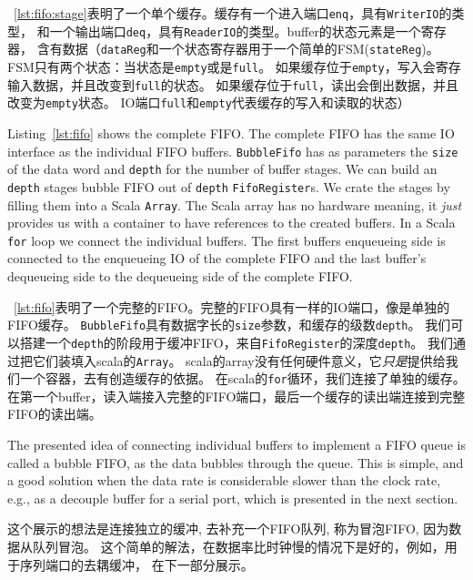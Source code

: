 \documentclass[%
    10pt,
    headinclude, footexclude,
    openright, %
    notitlepage,
    cleardoubleempty,
    headsepline,
    pointlessnumbers,
    bibtotoc, idxtotoc,
    ]{scrbook}
\newcommand{\code}[1]{{\small{\texttt{#1}}}}
\begin{document}
~\ref{lst:fifo:stage}表明了一个单个缓存。缓存有一个进入端口\code{enq}，具有\code{WriterIO}的类型，
和一个输出端口\code{deq}，具有\code{ReaderIO}的类型。buffer的状态元素是一个寄存器，
含有数据（\code{dataReg}和一个状态寄存器用于一个简单的FSM(\code{stateReg})。
FSM只有两个状态：当状态是\code{empty}或是\code{full}。
如果缓存位于\code{empty}，写入会寄存输入数据，并且改变到\code{full}的状态。
如果缓存位于\code{full}，读出会倒出数据，并且改变为\code{empty}状态。
IO端口\code{full}和\code{empty}代表缓存的写入和读取的状态）


Listing~\ref{lst:fifo} shows the complete FIFO. The complete FIFO has
the same IO interface as the individual FIFO buffers.
\code{BubbleFifo} has as parameters the \code{size} of the data
word and \code{depth} for the number of buffer stages.
We can build an \code{depth} stages bubble FIFO out of \code{depth}
\code{FifoRegister}s. We crate the stages by filling them into a Scala \code{Array}.
The Scala array has no hardware meaning, it \emph{just} provides us with
a container to have references to the created buffers.
In a Scala \code{for} loop we connect the individual buffers.
The first buffers enqueueing side is connected to the enqueueing IO of
the complete FIFO and the last buffer's dequeueing side to the
dequeueing side of the complete FIFO.

~\ref{lst:fifo}表明了一个完整的FIFO。完整的FIFO具有一样的IO端口，像是单独的FIFO缓存。
\code{BubbleFifo}具有数据字长的\code{size}参数，和缓存的级数\code{depth}。
我们可以搭建一个\code{depth}的阶段用于缓冲FIFO，来自\code{FifoRegister}的深度\code{depth}。
我们通过把它们装填入scala的\code{Array}。
scala的array没有任何硬件意义，它\emph{只是}提供给我们一个容器，去有创造缓存的依据。
在scala的\code{for}循环，我们连接了单独的缓存。
在第一个buffer，读入端接入完整的FIFO端口，最后一个缓存的读出端连接到完整FIFO的读出端。



The presented idea of connecting individual buffers to implement a FIFO
queue is called a bubble FIFO, as the data bubbles through the queue.
This is simple, and a good solution when the data rate is considerable slower
than the clock rate, e.g., as a decouple buffer for a serial port, which is presented
in the next section.

这个展示的想法是连接独立的缓冲, 去补充一个FIFO队列, 称为冒泡FIFO, 因为数据从队列冒泡。
这个简单的解法，在数据率比时钟慢的情况下是好的，例如，用于序列端口的去耦缓冲，
在下一部分展示。
\end{document}
